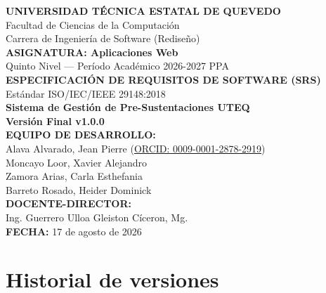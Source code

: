 \documentclass[11pt,a4paper]{article}
\title{}
\date{}
\begin{document}
\begin{titlepage}
\centering
\vspace*{1cm}
{\LARGE \textbf{UNIVERSIDAD TÉCNICA ESTATAL DE QUEVEDO}}\\[0.3cm]
{\large Facultad de Ciencias de la Computación}\\[0.2cm]
{\large Carrera de Ingeniería de Software (Rediseño)}\\[0.8cm]

{\large \textbf{ASIGNATURA: Aplicaciones Web}}\\[0.3cm]
{\large Quinto Nivel --- Período Académico 2026-2027 PPA}\\[1.2cm]

{\Large \textbf{ESPECIFICACIÓN DE REQUISITOS DE SOFTWARE (SRS)}}\\[0.3cm]
{\large Estándar ISO/IEC/IEEE 29148:2018}\\[0.6cm]
{\LARGE \textbf{Sistema de Gestión de Pre-Sustentaciones UTEQ}}\\[0.6cm]
{\Large \textbf{Versión Final v1.0.0}}\\[1.2cm]

\vfill
{\large \textbf{EQUIPO DE DESARROLLO:}}\\[0.3cm]
{\large Alava Alvarado, Jean Pierre \quad (\href{https://orcid.org/0009-0001-2878-2919}{ORCID: 0009-0001-2878-2919})}\\[0.1cm]
{\large Moncayo Loor, Xavier Alejandro}\\[0.1cm]
{\large Zamora Arias, Carla Esthefania}\\[0.1cm]
{\large Barreto Rosado, Heider Dominick}\\[1cm]

{\large \textbf{DOCENTE-DIRECTOR:}}\\[0.3cm]
{\large Ing. Guerrero Ulloa Gleiston Cíceron, Mg.}\\[1cm]

{\large \textbf{FECHA:} 17 de agosto de 2026}\\[0.5cm]
\end{titlepage}

\tableofcontents
\newpage

\section{Historial de versiones}
\end{document}
